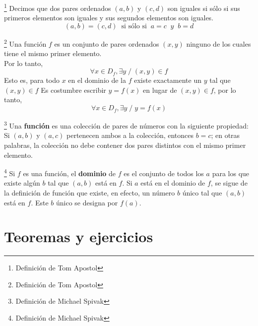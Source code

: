 \begin{tcolorbox}
\begin{def.}\footnote{Definición de Tom Apostol}
Decimos que dos pares ordenados $(a,b)$ \; y \; $(c,d)$ son iguales si sólo si sus primeros elementos son iguales y sus segundos elementos son iguales.\\  $$(a,b)=(c,d) \; \; \mbox{si sólo si} \; \; a=c \; \; y  \; \; b=d$$
\end{def.}

\begin{def.}\footnote{Definición de Tom Apostol}
Una función $f$ es un conjunto de pares ordenados $(x,y)$ ninguno de los cuales tiene el mismo primer elemento.\\
Por lo tanto, $$\forall x \in D_f, \exists y \; /\; (x,y)\in f$$ 
Esto es, para todo $x$ en el dominio de la $f$ existe exactamente un $y$ tal que $(x,y) \in f$
Es costumbre escribir $y=f(x)$ en lugar de $(x,y)\in f$, por lo tanto, $$\forall x \in D_f, \exists y \; / \; y=f(x)$$
\end{def.}
\end{tcolorbox}
\begin{tcolorbox}
\begin{def.} \footnote{Definición de Michael Spivak}
Una \textbf{función} es una colección de pares de números con la siguiente propiedad: Si $(a,b)$ \; y \; $(a,c)$ pertenecen ambos a la colección, entonces $b=c$; en otras palabras, la colección no debe contener dos pares distintos con el mismo primer elemento.\\
\end{def.}

\begin{def.} \footnote{Definición de Michael Spivak}
Si $f$ es una función, el \textbf{dominio} de $f$ es el conjunto de todos los $a$ para los que existe algún $b$ tal que $(a,b)$ está en $f$. Si $a$ está en el dominio de $f$, se sigue de la definición de función que existe, en efecto, un número $b$ único tal que $(a,b)$ está en $f$. Este $b$ único se designa por $f(a)$.\\  
\end{def.}
\end{tcolorbox}

\section{Teoremas y ejercicios}

